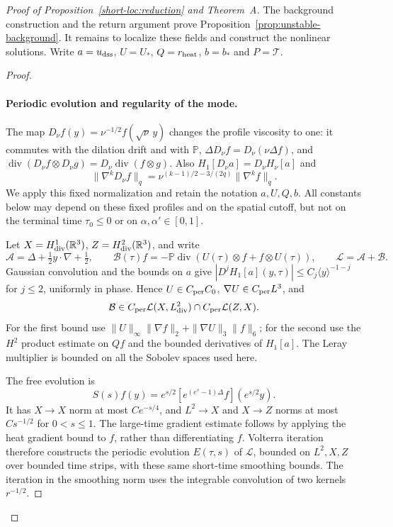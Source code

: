 \ifdefined\CompleteCandidate
\begin{proof}[Proof of Proposition~\ref{short-loc:reduction} and Theorem~A]
The background construction and the return argument prove
Proposition~\ref{prop:unstable-background}. It remains to localize these
fields and construct the nonlinear solutions. Write $a=u_{\rm dss}$,
$U=U_*$, $Q=r_{\rm heat}$, $b=b_*$ and $P=\mathcal T$.
\else
\begin{proof}
\leavevmode
\fi
\paragraph{Periodic evolution and regularity of the mode.}
The map $D_\nu f(y)=\nu^{-1/2}f(\sqrt \nu\,y)$ changes the profile viscosity
to one: it commutes with the dilation drift and with $\mathbb P$,
$\Delta D_\nu f=D_\nu(\nu\Delta f)$, and
$\operatorname{div}(D_\nu f\otimes D_\nu g)
=D_\nu\operatorname{div}(f\otimes g)$. Also
$H_1[D_\nu a]=D_\nu H_\nu[a]$ and
\[
 \|\nabla^kD_\nu f\|_q=\nu^{(k-1)/2-3/(2q)}\|\nabla^kf\|_q.
\]
We apply this fixed normalization and retain the notation $a,U,Q,b$.
All constants below may depend on these fixed profiles and on the
spatial cutoff, but not on the terminal time $\tau_0\le0$ or on
$\alpha,\alpha'\in[0,1]$.

Let $X=H^1_{\rm div}(\mathbb R^3)$, $Z=H^2_{\rm div}(\mathbb R^3)$,
and write
\[
 \mathcal A=\Delta+\tfrac12y\cdot\nabla+\tfrac12,
 \qquad \mathcal B(\tau)f
 =-\mathbb P\operatorname{div}(U(\tau)\otimes f+f\otimes U(\tau)),
 \qquad \mathcal L=\mathcal A+\mathcal B.
\]
Gaussian convolution and the bounds on $a$ give
$|D^jH_1[a](y,\tau)|\le C_j\langle y\rangle^{-1-j}$ for $j\le2$,
uniformly in phase. Hence $U\in C_{\rm per}C_0$,
$\nabla U\in C_{\rm per}L^3$, and
\[
 \mathcal B\in C_{\rm per}\mathcal L(X,L^2_{\rm div})
                 \cap C_{\rm per}\mathcal L(Z,X).
\]
For the first bound use
$\|U\|_\infty\|\nabla f\|_2+\|\nabla U\|_3\|f\|_6$;
for the second use the $H^2$ product estimate on $Qf$ and the
bounded derivatives of $H_1[a]$. The Leray multiplier is bounded on
all the Sobolev spaces used here.

The free evolution is
\[
 S(s)f(y)=e^{s/2}[e^{(e^s-1)\Delta}f](e^{s/2}y).
\]
It has $X\to X$ norm at most $Ce^{-s/4}$, and $L^2\to X$ and
$X\to Z$ norms at most $Cs^{-1/2}$ for $0<s\le1$. The large-time
gradient estimate follows by applying the heat gradient bound to $f$,
rather than differentiating $f$. Volterra iteration therefore constructs
the periodic evolution $E(\tau,s)$ of $\mathcal L$, bounded on
$L^2,X,Z$ over bounded time strips, with these same short-time smoothing
bounds. The iteration in the smoothing norm uses the integrable
convolution of two kernels $r^{-1/2}$.


\end{proof}
\end{proof}

